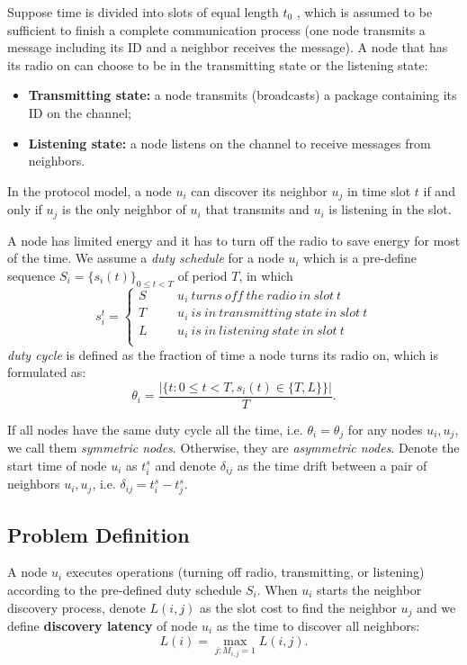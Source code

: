 Suppose time is divided into slots of equal length $t_0$
\cite{van2004lightweight}, which is assumed to be sufficient to finish a complete
communication process (one node transmits a message including its ID and
a neighbor receives the message).
A node that has its radio on can choose to be in the transmitting state
or the listening state:
\begin{itemize}
\item \textbf{Transmitting state:} a node transmits (broadcasts) a package containing its ID on the channel;
\item  \textbf{Listening state:} a node listens on the channel to receive messages from neighbors.
\end{itemize}
In the protocol model, a node $u_i$ can discover its neighbor $u_j$ in
time slot $t$ if and only if $u_j$ is the only neighbor of $u_i$ that
transmits and $u_i$ is listening in the slot.

A node has limited energy and it has to turn off the radio to save
energy for most of the time. We assume a \emph{duty schedule} for a node
$u_i$ which is a pre-define sequence $S_i=\{s_i(t)\}_{0\leq t<T}$ of period
$T$, in which
$$ s_i^t=\left\{
\begin{aligned}
S  & & & {u_i ~turns~ off~ the~ radio~ in~ slot~ t}  	 \\
T  & & & {u_i ~is~ in~ transmitting~ state~ in~ slot~ t}	\\
L  & & & {u_i ~is~ in~ listening~ state~ in~ slot~ t}	\\
\end{aligned}
\right.
$$
 \emph{duty cycle} is defined as the fraction of time a node turns its radio on, which is formulated as:
$$\theta_i=\frac{|\{t: 0\leq t<T, s_i(t) \in \{T,L\}\}|}{T}.
$$

If all nodes have the same duty cycle all the time, i.e. $\theta_i =
\theta_j$ for any nodes $u_i, u_j$, we call them \emph{symmetric nodes}.
Otherwise, they are \emph{asymmetric nodes}. Denote the start time of
node $u_i$ as $t_i^s$ and denote $\delta_{ij}$ as the time drift between
a pair of neighbors $u_i, u_j$, i.e. $\delta_{ij} = t_i^s - t_j^s$.

\subsection{Problem Definition}

A node $u_i$ executes operations (turning off radio, transmitting, or
listening) according to the pre-defined duty schedule $S_i$.
When $u_i$ starts the neighbor discovery process, denote $L(i,j)$ as the
slot cost to find the neighbor $u_j$ and we define \textbf{discovery
latency} of node $u_i$ as the time to discover all neighbors:
$$L(i) = \max_{j:M_{i,j}=1} L(i,j).
$$

